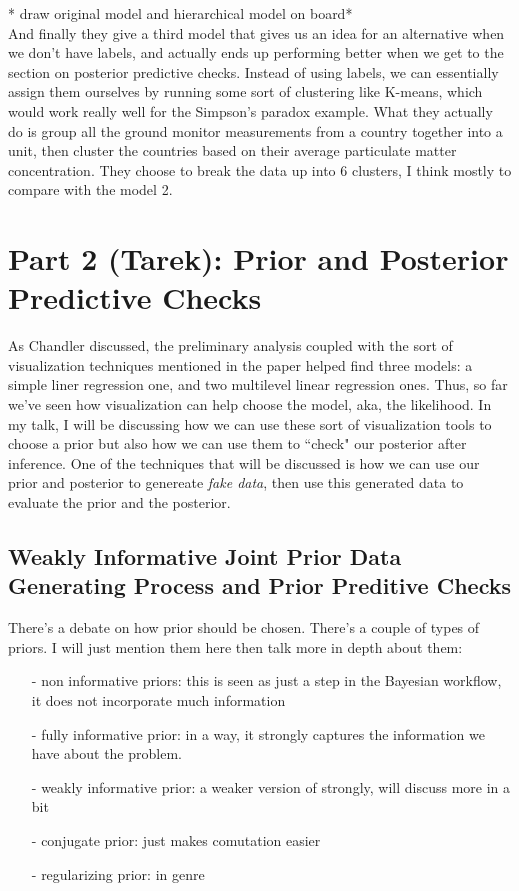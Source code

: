 \documentclass[]{article}
\begin{document}
* draw original model and hierarchical model on board*
\\

And finally they give a third model that gives us an idea for an alternative when we don't have labels, and actually ends up performing better when we get to the section on posterior predictive checks. Instead of using labels, we can essentially assign them ourselves by running some sort of clustering like K-means, which would work really well for the Simpson's paradox example. What they actually do is group all the ground monitor measurements from a country together into a unit, then cluster the countries based on their average particulate matter concentration. They choose to break the data up into 6 clusters, I think mostly to compare with the model 2.


\section*{Part 2 (Tarek): Prior and Posterior Predictive Checks}
As Chandler discussed, the preliminary analysis coupled with the sort of visualization techniques mentioned in the paper helped find three models: a simple liner regression one, and two multilevel linear regression ones. Thus, so far we've seen how visualization can help choose the model, aka, the likelihood. In my talk, I will be discussing how we can use these sort of visualization tools to choose a prior but also how we can use them to ``check" our posterior after inference. One of the techniques that will be discussed is how we can use our prior and posterior to genereate \emph{fake data}, then use this generated data to evaluate the prior and the posterior. 

\subsection*{Weakly Informative Joint Prior Data Generating Process and Prior Preditive Checks}
There's a debate on how prior should be chosen. There's a couple of types of priors. I will just mention them here then talk more in depth about them: 

\begin{itemize}
\item[-] non informative priors: this is seen as just a step in the Bayesian workflow, it does not incorporate much information
\item[-] fully informative prior: in a way, it strongly captures the information we have about the problem.
\item[-] weakly informative  prior: a weaker version of strongly, will discuss more in a bit
\item[-] conjugate prior: just makes comutation easier
\item[-] regularizing prior: in genre
\end{itemize}
\end{document}
